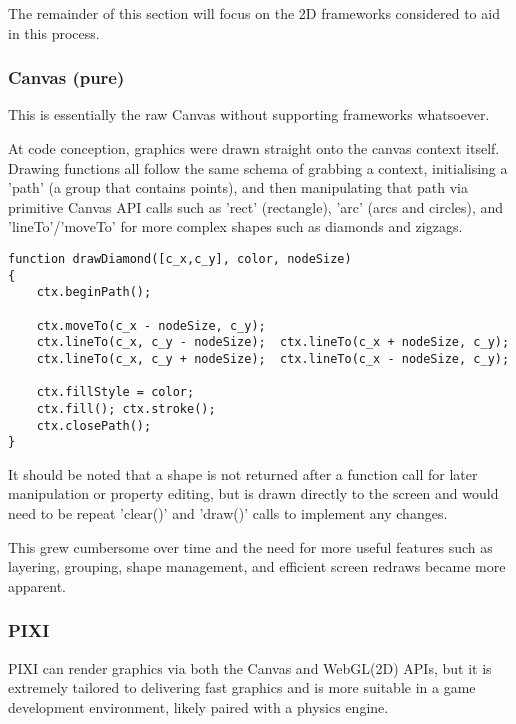 The remainder of this section will focus on the 2D frameworks considered to aid in this process.


\subsubsection{Canvas (pure)}

This is essentially the raw Canvas without supporting frameworks whatsoever.  

At code conception, graphics were drawn straight onto the canvas context itself. Drawing functions all follow the same schema of grabbing a context, initialising a 'path' (a group that contains points), and then manipulating that path via primitive Canvas API calls such as 'rect' (rectangle), 'arc' (arcs and circles), and 'lineTo'/'moveTo' for more complex shapes such as diamonds and zigzags. 

\begingroup
\begin{spacing}{1}
\begin{lstlisting}[label=code:canvasapi]
function drawDiamond([c_x,c_y], color, nodeSize)
{
    ctx.beginPath();

    ctx.moveTo(c_x - nodeSize, c_y); 
    ctx.lineTo(c_x, c_y - nodeSize);  ctx.lineTo(c_x + nodeSize, c_y); 
    ctx.lineTo(c_x, c_y + nodeSize);  ctx.lineTo(c_x - nodeSize, c_y);
    
    ctx.fillStyle = color; 
    ctx.fill(); ctx.stroke();
    ctx.closePath();
}
\end{lstlisting}
\vspace{-10pt}
\end{spacing}
\endgroup

It should be noted that a shape is not returned after a function call for later manipulation or property editing, but is drawn directly to the screen and would need to be repeat 'clear()' and 'draw()' calls to implement any changes.

This grew cumbersome over time and the need for more useful features such as layering, grouping, shape management, and efficient screen redraws became more apparent. 

\subsubsection{PIXI}

PIXI can render graphics via both the Canvas and WebGL(2D) APIs, but it is extremely tailored to delivering fast graphics and is more suitable in a game development environment, likely paired with a physics engine.\citep{pixi}

